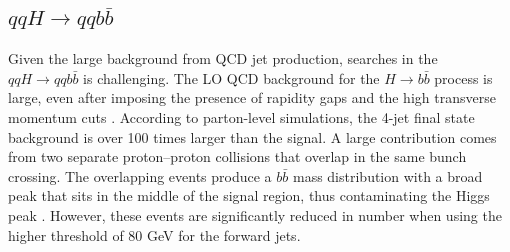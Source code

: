 \documentclass[a4paper,11pt]{article}
\begin{document}
\subsection{$qqH \rightarrow qqb  \bar{b}$}
Given the large background from QCD jet production, searches in the $qqH \rightarrow qqb  \bar{b}$ is challenging. The LO QCD background for the $H \rightarrow b \bar{b}$ process is large, even after imposing the presence of rapidity gaps and the high transverse momentum cuts \cite{DeRoeck:2002hk}. According to parton-level simulations, the 4-jet final state background is over 100 times larger than the signal. A large contribution comes from two separate proton–proton collisions that overlap in the same bunch crossing. The overlapping events produce a $b\bar{b}$ mass distribution with a broad peak that sits in the middle of the signal region, thus contaminating the Higgs peak \cite{Mangano:2002wn}. However, these events are significantly reduced in number when using the higher threshold of 80 GeV for the forward jets.
\end{document}
